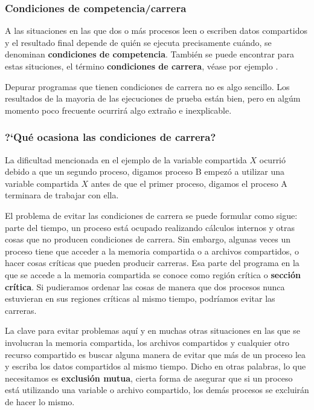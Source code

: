 \documentclass{article}
\begin{document}
\subsubsection*{Condiciones de competencia/carrera}
A las situaciones en las que dos o m\'as procesos leen o escriben 
datos compartidos y el resultado final depende de qui\'en se 
ejecuta precisamente cu\'ando, se denominan {\bf condiciones de 
competencia}. Tambi\'en se puede encontrar para estas situciones, 
el t\'ermino {\bf condiciones de carrera}, v\'ease por ejemplo 
\cite{LDD3}.

Depurar programas que tienen condiciones de carrera no es algo 
sencillo. Los resultados de la mayoria de las ejecuciones de 
prueba est\'an bien, pero en alg\'um momento poco frecuente 
ocurrir\'a algo extra\~no e inexplicable.

\subsubsection*{?`Qu\'e ocasiona las condiciones de carrera?}
La dif\/icultad mencionada en el ejemplo de la variable compartida 
$X$ ocurri\'o debido a que un segundo proceso, digamos proceso B 
empez\'o a utilizar una variable compartida $X$ antes de que el 
primer proceso, digamos el proceso A terminara de trabajar con 
ella.

El problema de evitar las condiciones de carrera se puede 
formular como sigue: parte del tiempo, un proceso est\'a ocupado 
realizando c\'alculos internos y otras cosas que no producen 
condiciones de carrera. Sin embargo, algunas veces un  proceso 
tiene que acceder a la memoria compartida o a archivos compartidos, 
o hacer cosas cr\'iticas que pueden producir carreras. Esa parte 
del programa en la que se accede a la memoria compartida se conoce 
como {regi\'on cr\'itica} o {\bf secci\'on cr\'itica}. Si pudieramos 
ordenar las cosas de manera que dos procesos nunca estuvieran en sus 
regiones cr\'iticas al mismo tiempo, podr\'iamos evitar las carreras.

La clave para evitar problemas aqu\'i y en muchas otras situaciones 
en las que se involucran la memoria compartida, los archivos 
compartidos y cualquier otro recurso compartido es buscar alguna 
manera de evitar que m\'as de un proceso lea y escriba los 
datos compartidos al mismo tiempo. Dicho en otras palabras, lo 
que necesitamos es {\bf exclusi\'on mutua}, cierta forma de asegurar 
que si un proceso est\'a utilizando una variable o archivo compartido, 
los dem\'as procesos se excluir\'an de hacer lo mismo.
\end{document}
